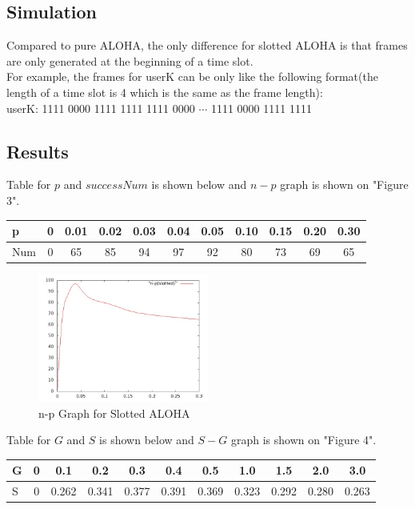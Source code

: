 \documentclass[11pt,a4paper]{report}
\begin{document}
\subsection*{Simulation}
Compared to pure ALOHA, the only difference for slotted ALOHA is that frames are only generated at the beginning of a time slot. \\

For example, the frames for userK can be only like the following format(the length of a time slot is 4 which is the same as the frame length): \\

\qquad userK: 1111 0000 1111 1111 1111 0000 \(\cdots\) 1111 0000 1111 1111 \\

\subsection*{Results}
Table for \(p\) and \(successNum\) is shown below and \(n-p\) graph is shown on "Figure 3".
\begin{table}[htbp]
\begin{tabular}{lcccccccccc}
\toprule
p & 0 & 0.01 & 0.02  & 0.03 & 0.04 & 0.05 & 0.10 & 0.15 & 0.20 & 0.30 \\
\midrule
Num & 0 & 65 & 85 & 94 & 97 & 92 & 80 & 73 & 69 & 65 \\
\bottomrule
\end{tabular}
\end{table}

\begin{figure}
\centering
\includegraphics[width=0.5\textwidth]{2_1.jpg}
\caption{n-p Graph for Slotted ALOHA}
\end{figure}

Table for \(G\) and \(S\) is shown below and \(S-G\) graph is shown on "Figure 4".
\begin{table}[htbp]
\begin{tabular}{lcccccccccc}
\toprule
G & 0 & 0.1 & 0.2  & 0.3 & 0.4 & 0.5 & 1.0 & 1.5 & 2.0 & 3.0 \\
\midrule
S & 0 & 0.262 & 0.341 & 0.377 & 0.391 & 0.369 & 0.323 & 0.292 & 0.280 & 0.263 \\
\bottomrule
\end{tabular}
\end{table}
\end{document}
